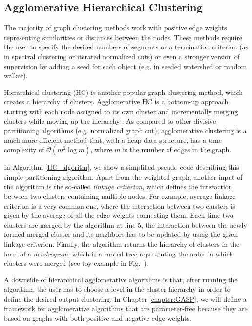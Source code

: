 \subsection{Agglomerative Hierarchical Clustering}
The majority of graph clustering methods work with positive edge weights representing similarities or distances between the nodes. These methods require the user to specify the desired numbers of segments or a termination criterion (as in spectral clustering or iterated normalized cuts) or even a stronger version of supervision by adding a seed for each object (e.g. in seeded watershed or random walker).  

Hierarchical clustering (HC) is another popular graph clustering method, which creates a hierarchy of clusters. Agglomerative HC is a bottom-up approach starting with each node assigned to its own cluster and incrementally merging clusters while moving up the hierarchy \cite{lance1967general}. As compared to other divisive partitioning algorithms (e.g. normalized graph cut), agglomerative clustering is a much more efficient method that, with a heap data-structure, has a time complexity of $\mathcal{O}(m^2 \log m)$, where $m$ is the number of edges in the graph. 

In Algorithm \ref{HC_algoritm}, we show a simplified pseudo-code describing this simple partitioning algorithm. Apart from the weighted graph, another input of the algorithm is the so-called \emph{linkage criterion}, which defines the interaction between two clusters containing multiple nodes. For example, average linkage criterion is a very common one, where the interaction between two clusters is given by the average of all the edge weights connecting them. Each time two clusters are merged by the algorithm at line 5, the interaction between the newly formed merged cluster and its neighbors has to be updated by using the given linkage criterion. 
Finally, the algorithm returns the hierarchy of clusters in the form of a \emph{dendrogram}, which is a rooted tree representing the order in which clusters were merged (see toy example in Fig.~). 

A downside of hierarchical agglomerative algorithms is that, after running the algorithm, the user has to choose a level in the cluster hierarchy in order to define the desired output clustering. 
In Chapter \ref{chapter:GASP}, we will define a framework for agglomerative algorithms that are parameter-free because they are based on graphs with both positive and negative edge weights.

